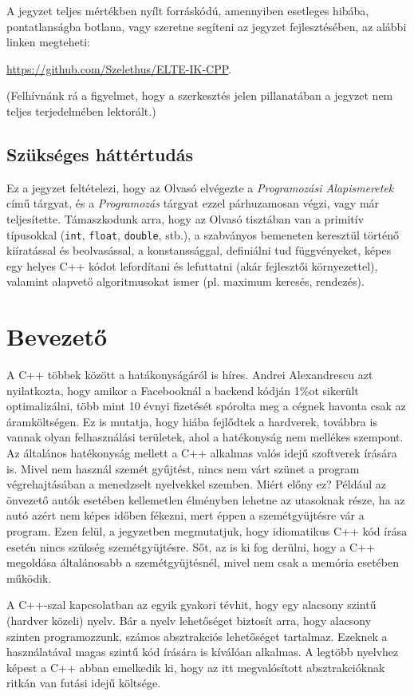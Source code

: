 \documentclass[../cpp_book/cpp_book.tex]{subfiles}
\begin{document}
	\smallskip
	A jegyzet teljes mértékben nyílt forráskódú, amennyiben esetleges hibába, pontatlanságba botlana, vagy szeretne segíteni az jegyzet fejlesztésében, az alábbi linken megteheti:
	
	\url{https://github.com/Szelethus/ELTE-IK-CPP}.
	
	\medskip
	(Felhívnánk rá a figyelmet, hogy a szerkesztés jelen pillanatában a jegyzet nem teljes terjedelmében lektorált.)

	\subsection{Szükséges háttértudás}
	Ez a jegyzet feltételezi, hogy az Olvasó elvégezte a \emph{Programozási Alapismeretek} című tárgyat, és a \emph{Programozás} tárgyat ezzel párhuzamosan végzi, vagy már teljesítette. Támaszkodunk arra, hogy az Olvasó tisztában van a primitív típusokkal (\texttt{int}, \texttt{float}, \texttt{double}, stb.), a szabványos bemeneten keresztül történő kiíratással és beolvasással, a konstanssággal, definiálni tud függvényeket, képes egy helyes C++ kódot lefordítani és lefuttatni (akár fejlesztői környezettel), valamint alapvető algoritmusokat ismer (pl. maximum keresés, rendezés).

	\section{Bevezető}
	A C++ többek között a hatákonyságáról is híres. Andrei Alexandrescu azt nyilatkozta, hogy amikor a Facebooknál a backend kódján 1\%ot sikerült optimalizálni, több mint 10 évnyi fizetését spórolta meg a cégnek havonta csak az áramköltségen. Ez is mutatja, hogy hiába fejlődtek a hardverek, továbbra is vannak olyan felhasználási területek, ahol a hatékonyság nem mellékes szempont. Az általános hatékonyság mellett a C++ alkalmas valós idejű szoftverek írására is. Mivel nem használ szemét gyűjtést, nincs nem várt szünet a program végrehajtásában a menedzselt nyelvekkel szemben. Miért előny ez? Például az önvezető autók esetében kellemetlen élményben lehetne az utasoknak része, ha az autó azért nem képes időben fékezni, mert éppen a szemétgyüjtésre vár a program. Ezen felül, a jegyzetben megmutatjuk, hogy idiomatikus C++ kód írása esetén nincs szükség szemétgyüjtésre. Sőt, az is ki fog derülni, hogy a C++ megoldása általánosabb a szemétgyüjtésnél, mivel nem csak a memória esetében működik.

	A C++-szal kapcsolatban az egyik gyakori tévhit, hogy egy alacsony szintű (hardver közeli) nyelv. Bár a nyelv lehetőséget biztosít arra, hogy alacsony szinten programozzunk, számos absztrakciós lehetőséget tartalmaz. Ezeknek a használatával magas szintű kód írására is kíválóan alkalmas. A legtöbb nyelvhez képest a C++ abban emelkedik ki, hogy az itt megvalósított absztrakcióknak ritkán van futási idejű költsége.
	
\end{document}
